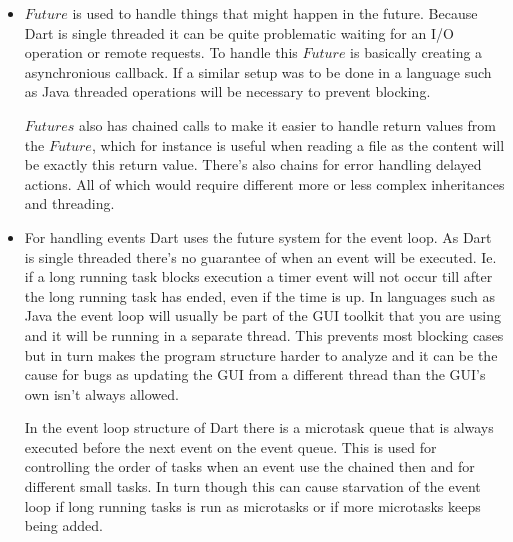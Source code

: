 \begin{itemize}
\item $Future$ is used to handle things that might happen in the
  future.  Because Dart is single threaded it can be quite problematic
  waiting for an I/O operation or remote requests.  To handle this
  $Future$ is basically creating a asynchronious callback.  If a
  similar setup was to be done in a language such as Java threaded
  operations will be necessary to prevent blocking.

  $Futures$ also has chained calls to make it easier to handle return
  values from the $Future$, which for instance is useful when reading
  a file as the content will be exactly this return value.  There's
  also chains for error handling delayed actions.  All of which would
  require different more or less complex inheritances and threading.

\item For handling events Dart uses the future system for the event
  loop.  As Dart is single threaded there's no guarantee of when an
  event will be executed.  Ie. if a long running task blocks execution
  a timer event will not occur till after the long running task has
  ended, even if the time is up.  In languages such as Java the event
  loop will usually be part of the GUI toolkit that you are using and
  it will be running in a separate thread.  This prevents most
  blocking cases but in turn makes the program structure harder to
  analyze and it can be the cause for bugs as updating the GUI from a
  different thread than the GUI's own isn't always allowed.

  In the event loop structure of Dart there is a microtask queue that
  is always executed before the next event on the event queue.  This
  is used for controlling the order of tasks when an event use the
  chained then and for different small tasks.  In turn though this can
  cause starvation of the event loop if long running tasks is run as
  microtasks or if more microtasks keeps being added.


\end{itemize}

